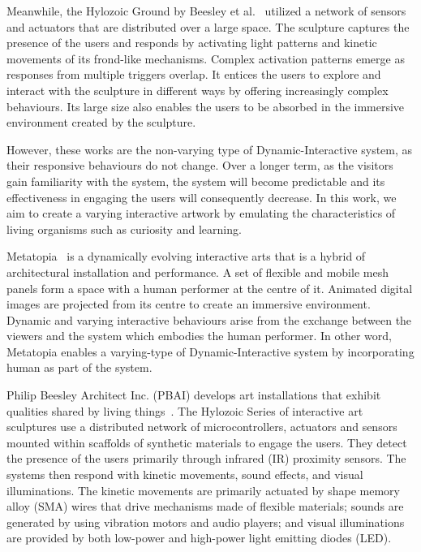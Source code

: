 Meanwhile, the Hylozoic Ground by Beesley et al.~\cite{Beesley2010} utilized a network of sensors and actuators that are distributed over a large space. The sculpture captures the presence of the users and responds by activating light patterns and kinetic movements of its frond-like mechanisms. Complex activation patterns emerge as responses from multiple triggers overlap. It entices the users to explore and interact with the sculpture in different ways by offering increasingly complex behaviours. Its large size also enables the users to be absorbed in the immersive environment created by the sculpture. 

However, these works are the non-varying type of Dynamic-Interactive system, as their responsive behaviours do not change. Over a longer term, as the visitors gain familiarity with the system, the system will become predictable and its effectiveness in engaging the users will consequently decrease. In this work, we aim to create a varying interactive artwork by emulating the characteristics of living organisms such as curiosity and learning. 

Metatopia~\cite{Metabody2014} is a dynamically evolving interactive arts that is a hybrid of architectural installation and performance. A set of flexible and mobile mesh panels form a space with a human performer at the centre of it. Animated digital images are projected from its centre to create an immersive environment. Dynamic and varying interactive behaviours arise from the exchange between the viewers and the system which embodies the human performer. In other word, Metatopia enables a varying-type of Dynamic-Interactive system by incorporating human as part of the system.

Philip Beesley Architect Inc. (PBAI) develops art installations that exhibit qualities shared by living things~\cite{Gorbet2015}. The Hylozoic Series of interactive art sculptures use a distributed network of microcontrollers, actuators and sensors mounted within scaffolds of synthetic materials to engage the users. They detect the presence of the users primarily through infrared (IR) proximity sensors. The systems then respond with kinetic movements, sound effects, and visual illuminations. The kinetic movements are primarily actuated by shape memory alloy (SMA) wires that drive mechanisms made of flexible materials; sounds are generated by using vibration motors and audio players; and visual illuminations are provided by both low-power and high-power light emitting diodes (LED). 

